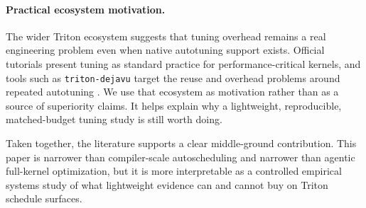 \paragraph{Practical ecosystem motivation.}
The wider Triton ecosystem suggests that tuning overhead remains a real engineering problem even when native autotuning support exists. Official tutorials present tuning as standard practice for performance-critical kernels, and tools such as \texttt{triton-dejavu} target the reuse and overhead problems around repeated autotuning \citep{ibm2025dejavu}. We use that ecosystem as motivation rather than as a source of superiority claims. It helps explain why a lightweight, reproducible, matched-budget tuning study is still worth doing.

Taken together, the literature supports a clear middle-ground contribution. This paper is narrower than compiler-scale autoscheduling and narrower than agentic full-kernel optimization, but it is more interpretable as a controlled empirical systems study of what lightweight evidence can and cannot buy on Triton schedule surfaces.
